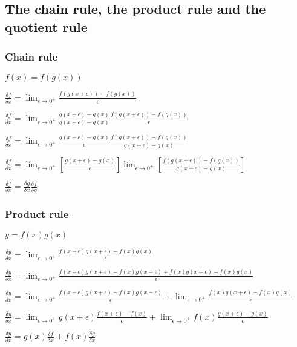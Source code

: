 
\subsection{The chain rule, the product rule and the quotient rule}

\subsubsection{Chain rule}

\(f(x)=f(g(x))\)

\(\frac{\delta f}{\delta x}=\lim_{\epsilon \rightarrow 0^+}\frac{f(g(x+\epsilon) )-f(g(x))}{\epsilon }\)

\(\frac{\delta f}{\delta x}=\lim_{\epsilon \rightarrow 0^+}\frac{g(x+\epsilon )-g(x)}{g(x+\epsilon )-g(x)}\frac{f(g(x+\epsilon) )-f(g(x))}{\epsilon }\)

\(\frac{\delta f}{\delta x}=\lim_{\epsilon \rightarrow 0^+}\frac{g(x+\epsilon )-g(x)}{\epsilon }\frac{f(g(x+\epsilon) )-f(g(x))}{g(x+\epsilon )-g(x)}\)

\(\frac{\delta f}{\delta x}=\lim_{\epsilon \rightarrow 0^+}[\frac{g(x+\epsilon )-g(x)}{\epsilon }]\lim_{\epsilon \rightarrow 0^+}[\frac{f(g(x+\epsilon) )-f(g(x))}{g(x+\epsilon )-g(x)}]\)

\(\frac{\delta f}{\delta x}=\frac{\delta g}{\delta x}\frac{\delta f}{\delta g}\)

\subsubsection{Product rule}

\(y=f(x)g(x)\)

\(\frac{\delta y}{\delta x}=\lim_{\epsilon \rightarrow 0^+}\frac{f(x+\epsilon )g(x+\epsilon )-f(x)g(x)}{\epsilon }\)

\(\frac{\delta y}{\delta x}=\lim_{\epsilon \rightarrow 0^+}\frac{f(x+\epsilon )g(x+\epsilon )-f(x)g(x+\epsilon )+f(x)g(x+\epsilon )-f(x)g(x)}{\epsilon }\)

\(\frac{\delta y}{\delta x}=\lim_{\epsilon \rightarrow 0^+}\frac{f(x+\epsilon )g(x+\epsilon )-f(x)g(x+\epsilon )}{\epsilon }+\lim_{\epsilon \rightarrow 0^+}\frac{f(x)g(x+\epsilon )-f(x)g(x)}{\epsilon }\)

\(\frac{\delta y}{\delta x}=\lim_{\epsilon \rightarrow 0^+}g(x+\epsilon )\frac{f(x+\epsilon )-f(x)}{\epsilon }+\lim_{\epsilon \rightarrow 0^+}f(x)\frac{g(x+\epsilon )-g(x)}{\epsilon }\)

\(\frac{\delta y}{\delta x}=g(x)\frac{\delta f}{\delta x }+f(x)\frac{\delta g}{\delta x}\)

